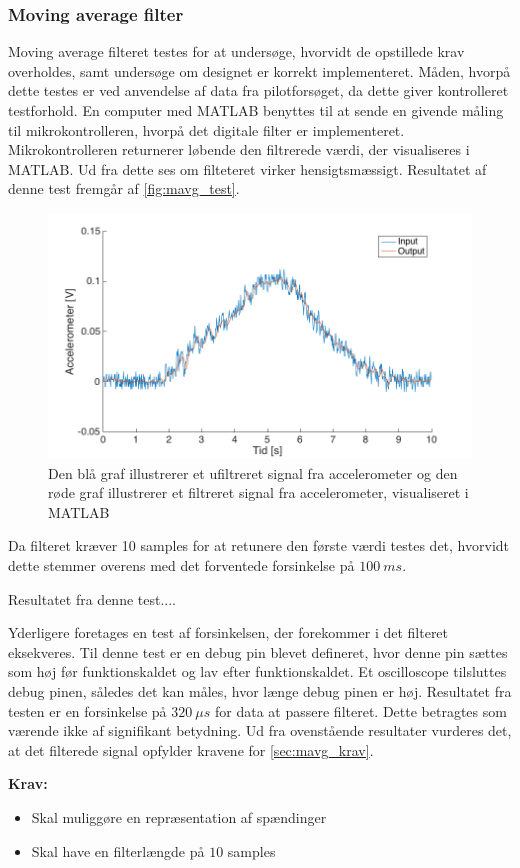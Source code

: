 \subsubsection{Moving average filter}
Moving average filteret testes for at undersøge, hvorvidt de opstillede krav overholdes, samt undersøge om designet er korrekt implementeret. Måden, hvorpå dette testes er ved anvendelse af data fra pilotforsøget, da dette giver kontrolleret testforhold. 
En computer med MATLAB benyttes til at sende en givende måling til mikrokontrolleren, hvorpå det digitale filter er implementeret. Mikrokontrolleren returnerer løbende den filtrerede værdi, der visualiseres i MATLAB. Ud fra dette ses om filteteret virker hensigtsmæssigt. 
Resultatet af denne test fremgår af \autoref{fig:mavg_test}. 

\begin{figure}[H]
	\centering
	\includegraphics[width=1\textwidth]{figures/accelerometer_filter}
	\caption{Den blå graf illustrerer et ufiltreret signal fra accelerometer og den røde graf illustrerer et filtreret signal fra accelerometer, visualiseret i MATLAB}
	\label{fig:mavg_test}
\end{figure}

\noindent
Da filteret kræver 10 samples for at retunere den første værdi testes det, hvorvidt dette stemmer overens med det forventede forsinkelse på $100~ms$. 

Resultatet fra denne test.... %

Yderligere foretages en test af forsinkelsen, der forekommer i det filteret eksekveres. Til denne test er en debug pin blevet defineret, hvor denne pin sættes som høj før funktionskaldet og lav efter funktionskaldet. Et oscilloscope tilsluttes debug pinen, således det kan måles, hvor længe debug pinen er høj. Resultatet fra testen er en forsinkelse på $320~\mu s$ for data at passere filteret. Dette betragtes som værende ikke af signifikant betydning.    
Ud fra ovenstående resultater vurderes det, at det filterede signal opfylder kravene for \autoref{sec:mavg_krav}. 


\vspace{3mm}
\textbf{Krav:}
\begin{itemize}
\item[\text{\sffamily \checkmark}] Skal muliggøre en repræsentation af spændinger 
\item[\text{\sffamily \checkmark}] Skal have en filterlængde på $10$ samples
\end{itemize}